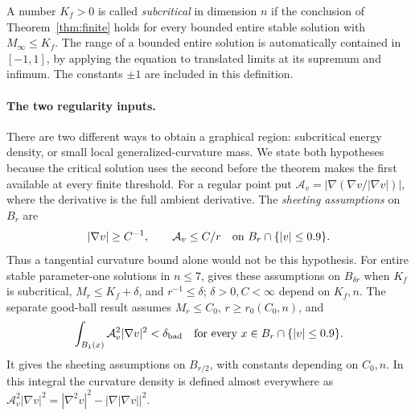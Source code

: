A number \(K_f>0\) is called \emph{subcritical} in dimension \(n\) if the
conclusion of Theorem~\ref{thm:finite} holds for every bounded entire stable
solution with \(M_\infty\le K_f\).  The range of a bounded entire solution
is automatically contained in \([-1,1]\), by applying the equation to
translated limits at its supremum and infimum.  The constants \(\pm1\)
are included in this definition.

\paragraph{The two regularity inputs.}
There are two different ways to obtain a graphical region: subcritical
energy density, or small local generalized-curvature mass. We state
both hypotheses because the critical solution uses the second before
the theorem makes the first available at every finite threshold. For a regular point put
\(\mathcal A_v=|\nabla(\nabla v/|\nabla v|)|\), where the derivative is the
full ambient derivative.  The \emph{sheeting assumptions} on \(B_r\) are
\[
 |\nabla v|\ge C^{-1},\qquad \mathcal A_v\le C/r
 \quad\hbox{on }B_r\cap\{|v|\le0.9\}.
\]
Thus a tangential curvature bound alone would not be this hypothesis.
For entire stable parameter-one solutions in \(n\le7\),
\cite[Theorem~3.2]{FSS2025} gives these assumptions on \(B_{\delta r}\)
when \(K_f\) is subcritical, \(M_r\le K_f+\delta\), and \(r^{-1}\le\delta\);
\(\delta>0,C<\infty\) depend on \(K_f,n\).
The separate good-ball result \cite[Theorem~3.4]{FSS2025} assumes
\(M_r\le C_0\), \(r\ge r_0(C_0,n)\), and
\[
 \int_{B_1(x)}\mathcal A_v^2|\nabla v|^2<\delta_{\rm bad}
 \quad\hbox{for every }x\in B_r\cap\{|v|\le0.9\}.
\]
It gives the sheeting assumptions on \(B_{r/2}\), with constants depending
on \(C_0,n\).  In this integral the curvature density is defined almost
everywhere as
\(
 \mathcal A_v^2|\nabla v|^2
 =|\nabla^2v|^2-|\nabla|\nabla v||^2.
\)

